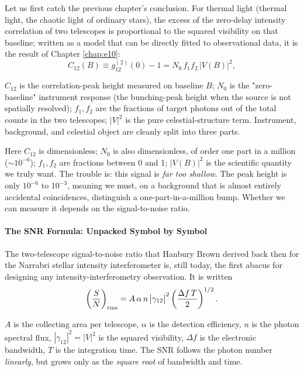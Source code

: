 Let us first catch the previous chapter's conclusion. For thermal light (thermal light, the chaotic light of ordinary stars), the excess of the zero-delay intensity correlation of two telescopes is proportional to the squared visibility on that baseline; written as a model that can be directly fitted to observational data, it is the result of Chapter \ref{chap:e10}:
\begin{equation}
  C_{12}(B)\equiv g_{12}^{(2)}(0)-1 = N_0\,f_1 f_2\,\big|V(B)\big|^2 ,
  \label{eq:e11-correlation-model}
\end{equation}
\begin{formulaexplain}
\(C_{12}\) is the correlation-peak height measured on baseline \(B\); \(N_0\) is the "zero-baseline" instrument response (the bunching-peak height when the source is not spatially resolved); \(f_1,f_2\) are the fractions of target photons out of the total counts in the two telescopes; \(|V|^2\) is the pure celestial-structure term. Instrument, background, and celestial object are cleanly split into three parts.
\end{formulaexplain}
Here \(C_{12}\) is dimensionless; \(N_0\) is also dimensionless, of order one part in a million (\(\sim10^{-6}\)); \(f_1,f_2\) are fractions between 0 and 1; \(|V(B)|^2\) is the scientific quantity we truly want. The trouble is: this signal is \emph{far too shallow}. The peak height is only \(10^{-6}\) to \(10^{-3}\), meaning we must, on a background that is almost entirely accidental coincidences, distinguish a one-part-in-a-million bump. Whether we can measure it depends on the signal-to-noise ratio.

\paragraph{The SNR Formula: Unpacked Symbol by Symbol}
\label{sec:e11-snr-formula}

The two-telescope signal-to-noise ratio that Hanbury Brown derived back then for the Narrabri stellar intensity interferometer is, still today, the first abacus for designing any intensity-interferometry observation. It is written
\begin{equation}
  \left(\frac{S}{N}\right)_{\rm rms}
  = A\,\alpha\,n\,\big|\gamma_{12}\big|^2
  \left(\frac{\Delta f\,T}{2}\right)^{1/2}.
  \label{eq:e11-snr}
\end{equation}
\begin{formulaexplain}
\(A\) is the collecting area per telescope, \(\alpha\) is the detection efficiency, \(n\) is the photon spectral flux, \(|\gamma_{12}|^2=|V|^2\) is the squared visibility, \(\Delta f\) is the electronic bandwidth, \(T\) is the integration time. The SNR follows the photon number \emph{linearly}, but grows only as the \emph{square root} of bandwidth and time.
\end{formulaexplain}

